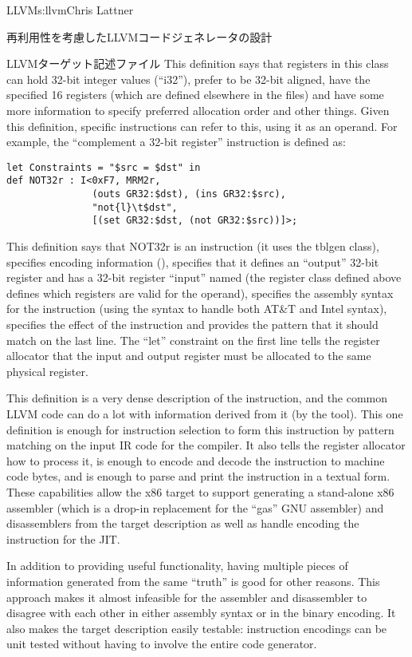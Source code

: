 \begin{aosachapter}{LLVM}{s:llvm}{Chris Lattner}
\begin{aosasect1}{再利用性を考慮したLLVMコードジェネレータの設計}
\begin{aosasect2}{LLVMターゲット記述ファイル}
\noindent This definition says that registers in this class can hold 32-bit
integer values (``i32''), prefer to be 32-bit aligned, have the
specified 16 registers (which are defined elsewhere in the 
files) and have some more information to specify preferred allocation
order and other things.  Given this definition, specific instructions
can refer to this, using it as an operand.  For example, the
``complement a 32-bit register'' instruction is defined as:

\begin{verbatim}
let Constraints = "$src = $dst" in
def NOT32r : I<0xF7, MRM2r,
               (outs GR32:$dst), (ins GR32:$src),
               "not{l}\t$dst",
               [(set GR32:$dst, (not GR32:$src))]>;
\end{verbatim}

\noindent This definition says that NOT32r is an instruction (it uses the
 tblgen class), specifies encoding information (), specifies that it defines an ``output'' 32-bit register
 and has a 32-bit register ``input'' named 
(the  register class defined above defines which registers
are valid for the operand), specifies the assembly syntax for the
instruction (using the \code{\{\}} syntax to handle both AT\&T and
Intel syntax), specifies the effect of the instruction and provides
the pattern that it should match on the last line.  The ``let''
constraint on the first line tells the register allocator that the
input and output register must be allocated to the same physical
register.

This definition is a very dense description of the instruction, and
the common LLVM code can do a lot with information derived from it (by
the  tool).  This one definition is enough for
instruction selection to form this instruction by pattern matching on
the input IR code for the compiler.  It also tells the register allocator how
to process it, is enough to encode and decode the instruction to
machine code bytes, and is enough to parse and print the instruction
in a textual form.  These capabilities allow the x86 target to support
generating a stand-alone x86 assembler (which is a drop-in replacement
for the ``gas'' GNU assembler) and disassemblers from the target
description as well as handle encoding the instruction for the JIT.

In addition to providing useful functionality, having multiple pieces
of information generated from the same ``truth'' is good for other
reasons.  This approach makes it almost infeasible for the assembler
and disassembler to disagree with each other in either assembly syntax
or in the binary encoding.  It also makes the target description
easily testable: instruction encodings can be unit tested without
having to involve the entire code generator.


\end{aosasect2}
\end{aosasect1}
\end{aosachapter}

